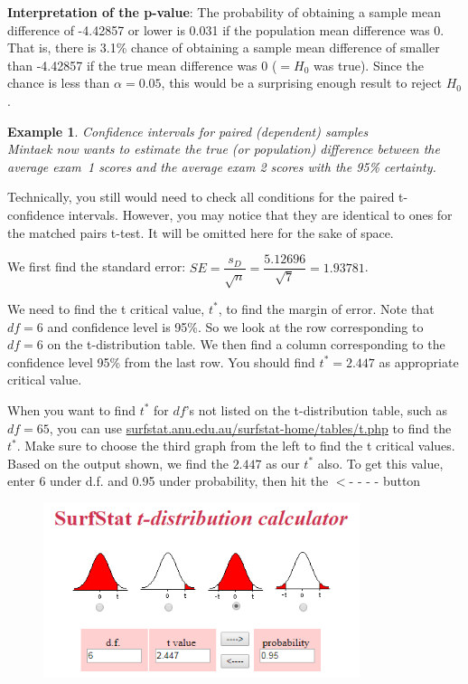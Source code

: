 \documentclass[12pt]{article}
\newcounter{lecnum}
\newtheorem{example}{Example}[lecnum]
\begin{document}
\noindent \textbf{Interpretation of the p-value}: The probability of obtaining a sample mean difference of -4.42857 or lower is 0.031 if the population mean difference was 0. That is, there is 3.1\% chance of obtaining a sample mean difference of smaller than -4.42857 if the true mean difference was 0 ($= H_0$ was true). Since the chance is less than $\alpha = 0.05$, this would be a surprising enough result to reject $H_0$.

\pagebreak

\begin{example} Confidence intervals for paired (dependent) samples \\
	Mintaek now wants to estimate the true (or population) difference between the average \mbox{exam 1} scores and the average exam 2 scores with the 95\% certainty.
\end{example}
	
Technically, you still would need to check all conditions for the paired t-confidence intervals. However, you may notice that they are identical to ones for the matched pairs t-test. It will be omitted here for the sake of space.

We first find the standard error: $SE = \dfrac{s_D}{\sqrt{n}} = \dfrac{5.12696}{\sqrt{7}} = 1.93781$. 

We need to find the t critical value, $t^*$, to find the margin of error. Note that $df = 6$ and confidence level is 95\%. So we look at the row corresponding to $df = 6$ on the t-distribution table. We then find a column corresponding to the confidence level 95\% from the last row. You should find $t^* = 2.447$ as appropriate critical value.

When you want to find $t^*$ for $df$'s not listed on the t-distribution table, such as $df = 65$, you can use \url{surfstat.anu.edu.au/surfstat-home/tables/t.php} to find the $t^*$. Make sure to choose the third graph from the left to find the t critical values. Based on the output shown, we find the $2.447$ as our $t^*$ also. To get this value, enter 6 under d.f. and 0.95 under probability, then hit the $<$- - - - button

\begin{figure}[!h]
	\centering
	\vspace{-10 pt}
	\includegraphics[width=9.25cm]{Figures/fig3.png}
	\vspace{-10 pt}
\end{figure}
\end{document}
